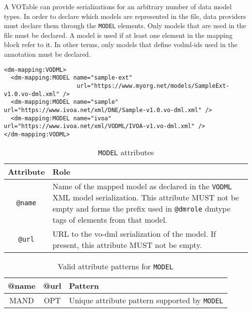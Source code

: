 A VOTable can provide serializations for an arbitrary number of data model
types. In order to declare which models are represented in the file, data
providers must declare them through the \texttt{MODEL} elements.
Only models that are used in the file must be declared. A model is
used if at least one element in the mapping block refer to it. In other terms, only models that define vodml-ids used in the
annotation must be declared.

\begin{lstlisting}[frame=single,caption={Example \texttt{MODEL} mapping block},style=XML,basicstyle=\tiny]
<dm-mapping:VODML>
  <dm-mapping:MODEL name="sample-ext"
                     url="https://www.myorg.net/models/SampleExt-v1.0.vo-dml.xml" />
  <dm-mapping:MODEL name="sample" url="https://www.ivoa.net/xml/DNE/Sample-v1.0.vo-dml.xml" />
  <dm-mapping:MODEL name="ivoa"   url="https://www.ivoa.net/xml/VODML/IVOA-v1.vo-dml.xml" />
</dm-mapping:VODML>
\end{lstlisting}

\begin{table}[!htbp]
  \small
  \centering
  \begin{tabulary}{\linewidth}{|c|J|}       
    \hline 
         \textbf{Attribute} & 
         \textbf {Role}\\
    \hline
    \hline  
         \texttt{@name}  & 
         Name of the mapped model as declared in the \texttt{VODML} XML model serialization.  This attribute MUST not be empty and forms the prefix used in  \texttt{@dmrole} dmtype tags of elements from that model.  \\
    \hline 
         \texttt{@url} & 
         URL to the vo-dml serialization of the model. If present, this attribute MUST not be empty.\\
    \hline 
  \end{tabulary}
  \caption{\texttt{MODEL} attributes} 
  \label{tbl:model-att}
\end{table}


\begin{table}[!htbp]
  \small
  \centering
  \begin{tabulary}{\linewidth}{|c |c |J|}
    \hline 
        \textbf{@name} &
        \textbf{@url} &
        \textbf{Pattern}\\
    \hline      \hline  
        MAND &           
        OPT &           
        Unique attribute pattern supported by \texttt{MODEL}\\
    \hline 
  \end{tabulary}
  \caption{Valid attribute patterns for  \texttt{MODEL}} 
  \label{tbl:model-pattern}
\end{table}
